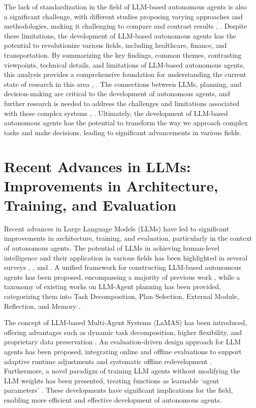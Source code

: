 \documentclass[conference]{IEEEtran}
\begin{document}
The lack of standardization in the field of LLM-based autonomous agents is also a significant challenge, with different studies proposing varying approaches and methodologies, making it challenging to compare and contrast results \cite{2401.03428}, \cite{2412.17481}. Despite these limitations, the development of LLM-based autonomous agents has the potential to revolutionize various fields, including healthcare, finance, and transportation. By summarizing the key findings, common themes, contrasting viewpoints, technical details, and limitations of LLM-based autonomous agents, this analysis provides a comprehensive foundation for understanding the current state of research in this area \cite{2308.11432}, \cite{2402.02716}. The connections between LLMs, planning, and decision-making are critical to the development of autonomous agents, and further research is needed to address the challenges and limitations associated with these complex systems \cite{2411.14033}, \cite{2409.14457}. Ultimately, the development of LLM-based autonomous agents has the potential to transform the way we approach complex tasks and make decisions, leading to significant advancements in various fields.

\section{Recent Advances in LLMs: Improvements in Architecture, Training, and Evaluation}
Recent advances in Large Language Models (LLMs) have led to significant improvements in architecture, training, and evaluation, particularly in the context of autonomous agents. The potential of LLMs in achieving human-level intelligence and their application in various fields has been highlighted in several surveys \cite{2308.11432}, \cite{2402.02716}, and \cite{2411.14033}. A unified framework for constructing LLM-based autonomous agents has been proposed, encompassing a majority of previous work \cite{2308.11432}, while a taxonomy of existing works on LLM-Agent planning has been provided, categorizing them into Task Decomposition, Plan Selection, External Module, Reflection, and Memory \cite{2402.02716}.

The concept of LLM-based Multi-Agent Systems (LaMAS) has been introduced, offering advantages such as dynamic task decomposition, higher flexibility, and proprietary data preservation \cite{2411.14033}. An evaluation-driven design approach for LLM agents has been proposed, integrating online and offline evaluations to support adaptive runtime adjustments and systematic offline redevelopment \cite{2411.13768}. Furthermore, a novel paradigm of training LLM agents without modifying the LLM weights has been presented, treating functions as learnable `agent parameters' \cite{2402.11359}. These developments have significant implications for the field, enabling more efficient and effective development of autonomous agents.
\end{document}
